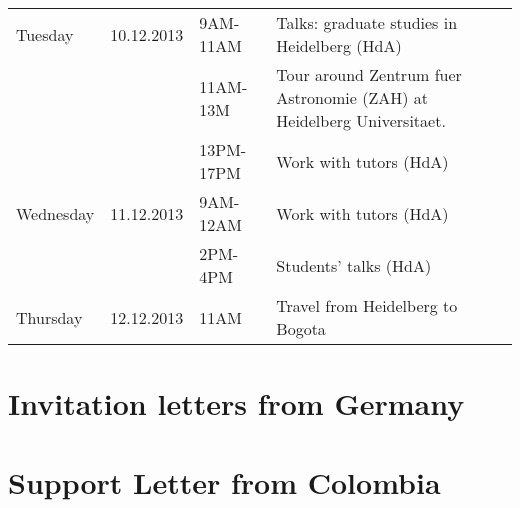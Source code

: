 \documentclass[12pt]{article}
\begin{document}
\begin{tabular}{p{2cm}p{2cm}p{2.5cm}p{7.0cm}}
Tuesday &10.12.2013  & 9AM-11AM & Talks: graduate studies in Heidelberg (HdA)\\
& & 11AM-13M & Tour around Zentrum fuer Astronomie (ZAH) at Heidelberg Universitaet.\\
 & & 13PM-17PM & Work with tutors (HdA)\\\hline

Wednesday &11.12.2013 & 9AM-12AM	&Work with tutors (HdA)\\
& & 2PM-4PM  & Students' talks (HdA)\\\hline

Thursday &12.12.2013&11AM	& Travel from Heidelberg to Bogota\\\hline\hline
\end{tabular}

\section{Invitation letters from Germany}

\section{Support Letter from Colombia}
\end{document}
